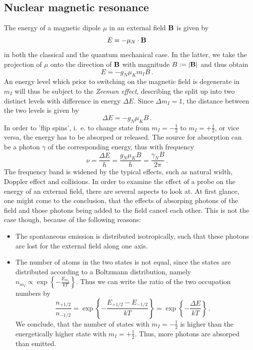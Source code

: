 \subsection{Nuclear magnetic resonance}
The energy of a magnetic dipole $\mu$ in an external field $\mathbf{B}$ is given by 
\begin{equation}
    E = - \mu_N \cdot \mathbf{B}
\end{equation}
in both the classical and the quantum mechanical case. In the latter, 
we take the projection of $\mu$ onto the direction of $\mathbf{B}$ with magnitude 
$B := |\mathbf{B}|$ and thus obtain 
\begin{equation}
    E = - g_N \mu_K m_I B \, .
\end{equation}
An energy level which prior to switching on the magnetic field is degenerate in $m_I$ 
will thus be subject to the \emph{Zeeman effect}, describing the split up into two 
distinct levels with difference in energy $\Delta E$. Since $\Delta m_I = 1$, the 
distance between the two levels is given by 
\begin{equation}
    \Delta E = - g_N \mu_K B \, .
\end{equation}
In order to 'flip spins', i.~e. to change state from $m_I = - \frac{1}{2}$ to $m_I = + \frac{1}{2}$, 
or vice versa, the energy has to be absorped or released. The source for absorption can be a photon $\gamma$
of the corresponding energy, thus with frequency 
\begin{equation}
    \nu = \frac{\Delta E}{h} = \frac{g_N \mu_K B}{h} = \frac{\gamma_N B}{2 \pi}\, .
\end{equation}
The frequency band is widened by the typical effects, such as natural width, Doppler effect 
and collisions. 
In order to examine the effect of a probe on the energy of an external field, there are several
aspects to look at. At first glance, one might come to the conclusion, that the effects of 
absorping photons of the field and those photons being added to the field cancel each other. 
This is not the case though, because of the following reasons:
\begin{itemize}
    \item
        The spontaneous emission is distributed isotropically, such that these photons are lost for 
        the external field along one axis.
    \item
        The number of atoms in the two states is not equal, since the states are distributed according to 
        a Boltzmann distribution, namely $n_{m_I} \propto \exp\left\{-\frac{E_{m_I}}{kT}\right\}$. 
        Thus we can write the ratio of the two occupation numbers by
        \begin{equation}
            \frac{n_{+1/2}}{n_{-1/2}} 
                = \exp\left\{-\frac{E_{+1/2} - E_{-1/2}}{kT} \right\}
                = \exp\left\{-\frac{\Delta E}{kT} \right\} \, .
        \end{equation}
        We conclude, that the number of states with $m_I = -\frac{1}{2}$ is higher than the energetically 
        higher state with $m_I = +\frac{1}{2}$. Thus, more photons are absorped than emitted. 
\end{itemize}
